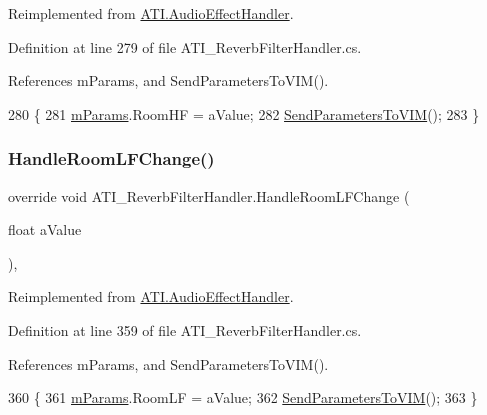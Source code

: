 Reimplemented from \hyperlink{class_a_t_i_1_1_audio_effect_handler_af3f3b123b89b6e53dce5a7c22190f5b6}{A\+T\+I.\+Audio\+Effect\+Handler}.



Definition at line 279 of file A\+T\+I\+\_\+\+Reverb\+Filter\+Handler.\+cs.



References m\+Params, and Send\+Parameters\+To\+V\+I\+M().


\begin{DoxyCode}
280     \{
281         \hyperlink{class_a_t_i___reverb_filter_handler_a034260fbce2052b42bceddc891632347}{mParams}.RoomHF = aValue;
282         \hyperlink{class_a_t_i___reverb_filter_handler_aacb469dc3038fca616d638f6a5a04a30}{SendParametersToVIM}();
283     \}
\end{DoxyCode}
\mbox{\label{class_a_t_i___reverb_filter_handler_a52fe6f9775f8e51296580f7a96b47bdb}} 
\subsubsection{\texorpdfstring{Handle\+Room\+L\+F\+Change()}{HandleRoomLFChange()}}
{\footnotesize\ttfamily override void A\+T\+I\+\_\+\+Reverb\+Filter\+Handler.\+Handle\+Room\+L\+F\+Change (\begin{DoxyParamCaption}\item[{float}]{a\+Value }\end{DoxyParamCaption})\hspace{0.3cm}{\ttfamily [protected]}, {\ttfamily [virtual]}}



Reimplemented from \hyperlink{class_a_t_i_1_1_audio_effect_handler_ae2648d4ab8a617cbc509f7cfc38f21f6}{A\+T\+I.\+Audio\+Effect\+Handler}.



Definition at line 359 of file A\+T\+I\+\_\+\+Reverb\+Filter\+Handler.\+cs.



References m\+Params, and Send\+Parameters\+To\+V\+I\+M().


\begin{DoxyCode}
360     \{
361         \hyperlink{class_a_t_i___reverb_filter_handler_a034260fbce2052b42bceddc891632347}{mParams}.RoomLF = aValue;
362         \hyperlink{class_a_t_i___reverb_filter_handler_aacb469dc3038fca616d638f6a5a04a30}{SendParametersToVIM}();
363     \}
\end{DoxyCode}
\mbox{\label{class_a_t_i___reverb_filter_handler_a084dca3566139f350b0372d3ee85af84}} 
